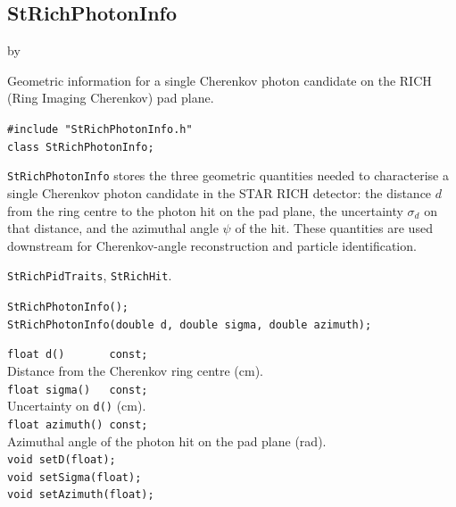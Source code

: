 \documentclass[twoside]{article}
\newcommand{\entrylabel}[1]{\mbox{\textbf{{#1}}}\hfil}%
\newenvironment{entry}
{\begin{list}{}%
    {\renewcommand{\makelabel}{\entrylabel}%
     \setlength{\labelwidth}{90pt}%
     \setlength{\leftmargin}{\labelwidth}
     \advance\leftmargin by \labelsep%
      }%
    }%
  {\end{list}}
\newcommand{\Entrylabel}[1]%
{\raisebox{0pt}[1ex][0pt]{\makebox[\labelwidth][l]%
    {\parbox[t]{\labelwidth}{\hspace{0pt}\textbf{{#1}}}}}}
\newenvironment{Entry}%
{\renewcommand{\entrylabel}{\Entrylabel}\begin{entry}}%
  {\end{entry}}
\begin{document}
\subsection{StRichPhotonInfo}
\label{sec:StRichPhotonInfo}
\begin{Entry}
\item[Summary]
    Geometric information for a single Cherenkov photon candidate on the RICH
    (Ring Imaging Cherenkov) pad plane.

\item[Synopsis]
    \verb+#include "StRichPhotonInfo.h"+\\
    \verb+class StRichPhotonInfo;+\\

\item[Description]
    \texttt{StRichPhotonInfo} stores the three geometric quantities needed
    to characterise a single Cherenkov photon candidate in the STAR RICH
    detector: the distance $d$ from the ring centre to the photon hit on the
    pad plane, the uncertainty $\sigma_d$ on that distance, and the azimuthal
    angle $\psi$ of the hit.  These quantities are used downstream for
    Cherenkov-angle reconstruction and particle identification.

\item[Related Classes]
    \texttt{StRichPidTraits}, \texttt{StRichHit}.

\item[Public\\ Constructors]
    \verb+StRichPhotonInfo();+\\
    \verb+StRichPhotonInfo(double d, double sigma, double azimuth);+\\

\item[Public Member\\ Functions]
    \verb+float d()       const;+\\
        Distance from the Cherenkov ring centre (cm).\\
    \verb+float sigma()   const;+\\
        Uncertainty on \texttt{d()} (cm).\\
    \verb+float azimuth() const;+\\
        Azimuthal angle of the photon hit on the pad plane (rad).\\
    \verb+void setD(float);+\\
    \verb+void setSigma(float);+\\
    \verb+void setAzimuth(float);+\\
\end{Entry}
\clearpage
\end{document}
